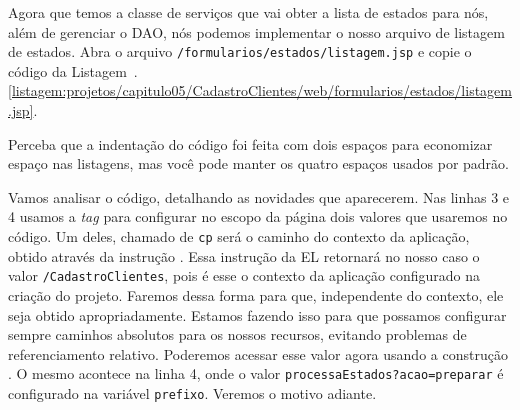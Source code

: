 Agora que temos a classe de serviços que vai obter a lista de estados para nós, além de gerenciar o DAO, nós podemos implementar o nosso arquivo de listagem de estados. Abra o arquivo \texttt{/formularios/estados/listagem.jsp} e copie o código da Listagem~\thechapter.\ref{listagem:projetos/capitulo05/CadastroClientes/web/formularios/estados/listagem.jsp}.


Perceba que a indentação do código foi feita com dois espaços para economizar espaço nas listagens, mas você pode manter os quatro espaços usados por padrão.

Vamos analisar o código, detalhando as novidades que aparecerem. Nas linhas 3 e 4 usamos a \textit{tag}  para configurar no escopo da página dois valores que usaremos no código. Um deles, chamado de \texttt{cp} será o caminho do contexto da aplicação, obtido através da instrução . Essa instrução da EL retornará no nosso caso o valor \texttt{/CadastroClientes}, pois é esse o contexto da aplicação configurado na criação do projeto. Faremos dessa forma para que, independente do contexto, ele seja obtido apropriadamente. Estamos fazendo isso para que possamos configurar sempre caminhos absolutos para os nossos recursos, evitando problemas de referenciamento relativo. Poderemos acessar esse valor agora usando a construção . O mesmo acontece na linha 4, onde o valor \texttt{processaEstados?acao=preparar} é configurado na variável \texttt{prefixo}. Veremos o motivo adiante.

